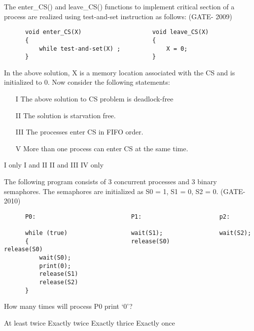 \begin{minipage}{\linewidth}

  \question  The enter\_CS() and leave\_CS() functions to implement critical section of a process are realized using test-and-set instruction as follows: (GATE- 2009)

  \begin{lstlisting}
      void enter_CS(X)                    void leave_CS(X)
      {                                   {
          while test-and-set(X) ;             X = 0;
      }                                   }
  \end{lstlisting}
  In the above solution, X is a memory location associated with the CS and is initialized to 0. Now consider the following statements:
  \begin{enumerate}
      \item[I]  The above solution to CS problem is deadlock-free
      \item[II] The solution is starvation free.
      \item[III] The processes enter CS in FIFO order.
      \item[V]   More than one process can enter CS at the same time.
   \end{enumerate}

  \begin{choices}
    \choice  I only
    \choice  I and II
    \choice  II and III
    \choice   IV only
  \end{choices}

  \end{minipage}

\vspace{0.08in}


\begin{minipage}{\linewidth}

  \question  The following program consists of 3 concurrent processes and 3 binary semaphores.
             The semaphores are initialized as S0 = 1, S1 = 0, S2 = 0. (GATE- 2010)

  \begin{lstlisting}
      P0:                           P1:                      p2:

      while (true)                  wait(S1);                wait(S2);
      {                             release(S0)              release(S0)
          wait(S0);
          print(0);
          release(S1)
          release(S2)
      }
  \end{lstlisting}
  How many times will process P0 print ‘0’?

  \begin{choices}
    \choice  At least twice
    \choice  Exactly twice
    \choice  Exactly thrice
    \choice  Exactly once
  \end{choices}

  \end{minipage}


